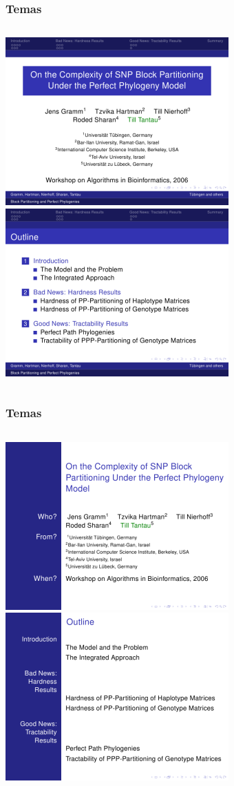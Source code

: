\documentclass{beamer}
\begin{document}
\begin{frame}
   \frametitle{Temas}
   \begin{columns}
      \includegraphics[width=0.45\paperwidth]{imagens/Berlin01.png}
      \includegraphics[width=0.45\paperwidth]{imagens/Berlin02.png}
   \end{columns}
\end{frame}
\begin{frame}
   \frametitle{Temas}
   \begin{columns}
      \includegraphics[width=0.45\paperwidth]{imagens/Bergen01.png}
      \includegraphics[width=0.45\paperwidth]{imagens/Bergen02.png}
   \end{columns}
\end{frame}
\end{document}
